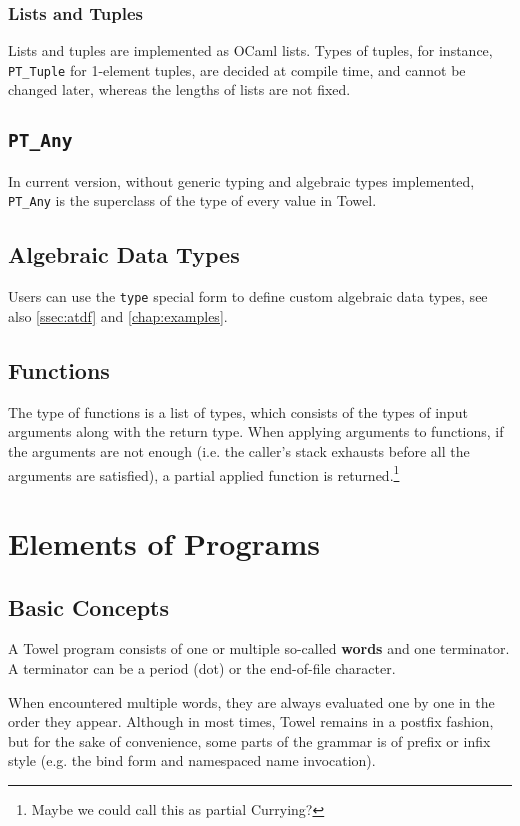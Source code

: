 \documentclass{book}
\begin{document}
\subsection{Lists and Tuples}
Lists and tuples are implemented as OCaml lists. Types of tuples, for instance, \texttt{PT\_Tuple} for 1-element tuples, are decided at compile time, and cannot be changed later, whereas the lengths of lists are not fixed.

\section{\texttt{PT\_Any}}
In current version, without generic typing and algebraic types implemented, \texttt{PT\_Any} is the superclass of the type of every value in Towel.

\section{Algebraic Data Types}
Users can use the \texttt{type} special form to define custom algebraic data types, see also \autoref{ssec:atdf} and \autoref{chap:examples}.

\section{Functions}
The type of functions is a list of types, which consists of the types of input arguments along with the return type. When applying arguments to functions, if the arguments are not enough (i.e. the caller's stack exhausts before all the arguments are satisfied), a partial applied function is returned.\footnote{Maybe we could call this as partial Currying?}

\chapter{Elements of Programs}
\label{chap:forms}

\section{Basic Concepts}

A Towel program consists of one or multiple so-called \textbf{words} and one terminator. A terminator can be a period (dot) or the end-of-file character.

When encountered multiple words, they are always evaluated one by one in the order they appear. Although in most times, Towel remains in a postfix fashion, but for the sake of convenience, some parts of the grammar is of prefix or infix style (e.g. the bind form and namespaced name invocation).
\end{document}

